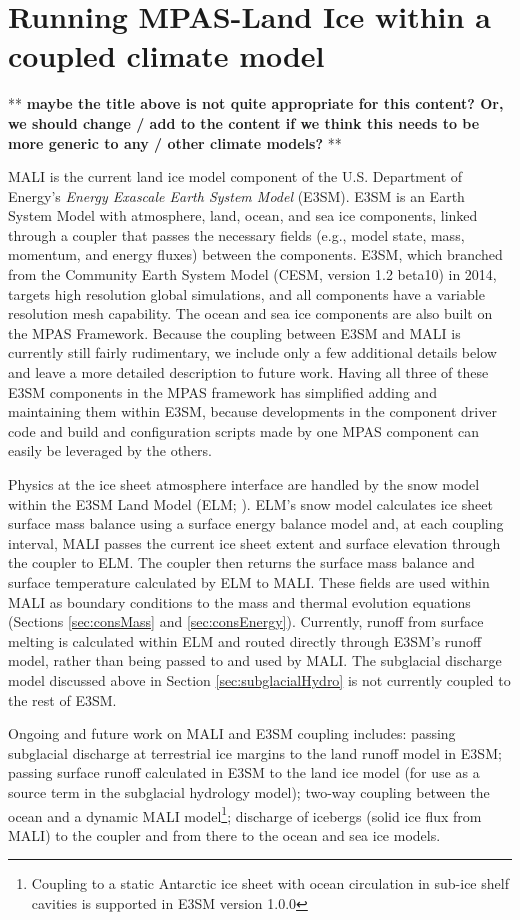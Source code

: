 \chapter{Running MPAS-Land Ice within a coupled climate model}
\label{chap:climatemodel_landice_coupling}

** \textbf{maybe the title above is not quite appropriate for this content? Or, we should change / add to the content if we think this needs to be more generic to any / other climate models?} **


MALI is the current land ice model component of the U.S. Department of Energy's \textit{Energy Exascale Earth System Model} (E3SM). E3SM is an Earth System Model with atmosphere, land, ocean, and sea ice components, linked through a coupler
that passes the necessary fields (e.g., model state, mass, momentum, and energy fluxes) between the components.
E3SM, which branched from the Community Earth System Model (CESM, version 1.2 beta10) in 2014, targets high resolution global simulations, and all components have a variable resolution mesh capability. The ocean \citep{Ringler2013,Petersen2015,Petersen2018} and sea ice \citep{Turner2018} components are also built on the MPAS Framework. Because the coupling between E3SM and MALI is currently still fairly rudimentary, we include only a few additional details below and leave a more detailed description to future work. 
Having all three of these E3SM components in the MPAS framework has simplified adding and maintaining them within E3SM,
because developments in the component driver code and build and configuration scripts made by one MPAS component can easily be leveraged by the others.
	
Physics at the ice sheet atmosphere interface are handled by the snow model within the E3SM Land Model (ELM; \cite{ELM2018a,ELM2018b}). ELM's snow model calculates ice sheet surface mass balance using a surface energy balance model and, at each coupling interval, MALI passes the current ice sheet extent and surface elevation through the coupler to ELM. The coupler then returns the surface mass balance and surface temperature calculated by ELM to MALI. These fields are used within MALI as boundary conditions to the mass and thermal evolution equations (Sections \ref{sec:consMass} and \ref{sec:consEnergy}). Currently, runoff from surface melting is calculated within ELM and routed directly through E3SM's runoff model, rather than being passed to and used by MALI. The subglacial discharge model discussed above in Section \ref{sec:subglacialHydro} is not currently coupled to the rest of E3SM. 

Ongoing and future work on MALI and E3SM coupling includes: passing subglacial discharge at terrestrial ice margins to the land runoff model in E3SM; passing surface runoff calculated in E3SM to the land ice model (for use as a source term in the subglacial hydrology model); two-way coupling between the ocean and a dynamic MALI model\footnote{Coupling to a static Antarctic ice sheet with ocean circulation in sub-ice shelf cavities is supported in E3SM version 1.0.0}; discharge of icebergs (solid ice flux from MALI) to the coupler and from there to the ocean and sea ice models.